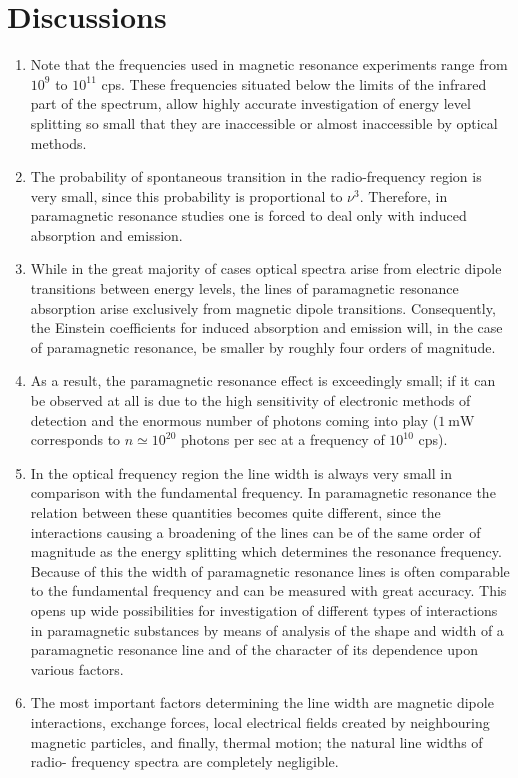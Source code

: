 \documentclass[%
 reprint,
nofootinbib,
 amsmath,amssymb,
 aps,
floatfix,
]{revtex4-2}
\begin{document}
\section{Discussions}
\begin{enumerate}
    \item Note that the frequencies used in magnetic resonance experiments range from $10^9$ to $10^{11}$ cps. These frequencies situated below the limits of the infrared part of the spectrum, allow highly accurate investigation of energy level splitting so small that they are inaccessible or almost inaccessible by optical methods. 
    \item The probability of spontaneous transition in the radio-frequency region is very small, since this probability is proportional to $\nu^3$. Therefore, in paramagnetic resonance studies one is forced to deal only with induced absorption and emission. 
    \item While in the great majority of cases optical spectra arise from electric dipole transitions between energy levels, the lines of paramagnetic resonance absorption arise exclusively from magnetic dipole transitions. Consequently, the Einstein coefficients for induced absorption and emission will, in the case of paramagnetic resonance, be smaller by roughly four orders of magnitude.
    \item As a result, the paramagnetic resonance effect is exceedingly small; if it can be observed at all is due to the high sensitivity of electronic methods of detection and the enormous number of photons coming into play ($\SI{1}{\milli \watt}$ corresponds to $n \simeq 10^{20}$ photons per sec at a frequency of $10^{10}$ cps). 
    \item In the optical frequency region the line width is always very small in comparison with the fundamental frequency. In paramagnetic resonance the relation between these quantities becomes quite different, since the interactions causing a broadening of the lines can be of the same order of magnitude as the energy splitting which determines the resonance frequency. Because of this the width of paramagnetic resonance lines is often comparable to the fundamental frequency and can be measured with great accuracy. This opens up wide possibilities for investigation of different types of interactions in paramagnetic substances by means of analysis of the shape and width of a paramagnetic resonance line and of the character of its dependence upon various factors. 
    \item The most important factors determining the line width are magnetic dipole interactions, exchange forces, local electrical fields created by neighbouring magnetic particles, and finally, thermal motion; the natural line widths of radio- frequency spectra are completely negligible. 

\end{enumerate}
\end{document}
